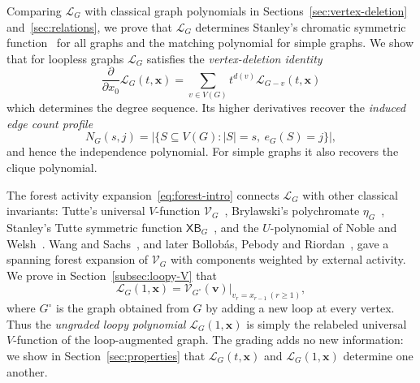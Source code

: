 \documentclass[11pt]{article}
\theoremstyle{plain}
\theoremstyle{definition}
\renewcommand{\mathcal}{\mathscr}
\newcommand{\LL}{\mathcal{L}}    %
\newcommand{\cV}{\mathcal{V}}    %
\newcommand{\bv}{\mathbf{v}}
\newcommand{\bx}{\mathbf{x}}
\newcommand{\XB}{\mathsf{XB}} %
\numberwithin{equation}{section}
\begin{document}
Comparing $\LL_G$ with classical graph polynomials
in Sections~\ref{sec:vertex-deletion} and~\ref{sec:relations},
we prove that $\LL_G$ determines Stanley's chromatic symmetric function~\cite{Sta} for all graphs and the matching polynomial for simple graphs.
%
We show that for loopless graphs $\LL_G$ satisfies the \emph{vertex-deletion identity}
\begin{equation}\label{eq:vertex-deletion-intro}
  \frac{\partial}{\partial x_0}\LL_G(t,\bx)
  =
  \sum_{v\in V(G)}t^{d(v)}\LL_{G-v}(t,\bx)
\end{equation}
which determines the degree sequence.
Its higher derivatives recover the \emph{induced edge count profile}
\[
  N_G(s,j) = |\{S\subseteq V(G):|S|=s,\ e_G(S)=j\}|,
\]
and hence the independence polynomial.
For simple graphs it also recovers the clique polynomial.


The forest activity expansion~\eqref{eq:forest-intro} connects $\LL_G$ with other classical
invariants: Tutte's universal $V$-function $\cV_G$~\cite{Tu1},
Brylawski's polychromate $\eta_G$~\cite{Bry}, Stanley's Tutte symmetric function $\XB_G$~\cite{Sta2}, and the $U$-polynomial of Noble and Welsh~\cite{NW}.
%
Wang and Sachs~\cite{WS}, and later Bollob\'{a}s, Pebody and Riordan~\cite{BPR},
gave a spanning forest expansion of $\cV_G$ with components weighted by external activity.
We prove in Section~\ref{subsec:loopy-V} that
\[
  \LL_G(1,\bx)    =    \left.   \cV_{G^\circ}(\bv)  \right|_{v_r=x_{r-1}\ (r\ge 1)},
\]
where $G^\circ$ is the graph obtained from $G$ by adding a new loop at every vertex.
%
Thus the \emph{ungraded loopy polynomial} $\LL_G(1,\bx)$ is simply the relabeled
universal $V$-function of the loop-augmented graph.
The grading adds no new information: we show in Section~\ref{sec:properties}
that $\LL_G(t,\bx)$ and $\LL_G(1,\bx)$ determine one another.
\end{document}
